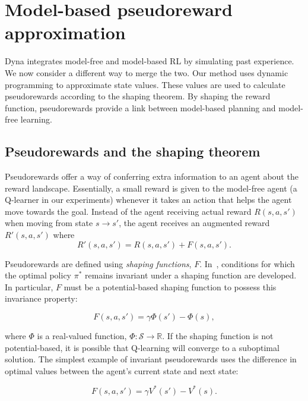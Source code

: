 \documentclass[letterpaper]{article}
\begin{document}
\section{Model-based pseudoreward approximation}

Dyna integrates model-free and model-based RL by simulating past experience. We now consider a different way to merge the two. Our method uses dynamic programming to approximate state values. These values are used to calculate pseudorewards according to the shaping theorem. By shaping the reward function, pseudorewards provide a link between model-based planning and model-free learning.

\subsection{Pseudorewards and the shaping theorem}

Pseudorewards offer a way of conferring extra information to an agent about the reward landscape. Essentially, a small reward is given to the model-free agent (a Q-learner in our experiments) whenever it takes an action that helps the agent move towards the goal. Instead of the agent receiving actual reward $R(s,a,s')$ when moving from state $s \rightarrow s'$, the agent receives an augmented reward $R'(s,a,s')$ where
\begin{equation}
R'(s,a,s') = R(s,a,s') + F(s,a,s').
\end{equation} 

Pseudorewards are defined using \textit{shaping functions}, $F$. In~\cite{ng1999policy}, conditions for which the optimal policy $\pi^*$ remains invariant under a shaping function are developed. In particular, $F$ must be a potential-based shaping function to possess this invariance property:

\begin{equation}
F(s,a,s') = \gamma \Phi(s') - \Phi(s) ,
\end{equation}

\noindent
where $\Phi$ is a real-valued function, $\Phi : \mathcal{S} \rightarrow \mathbb{R}$. If the shaping function is not potential-based, it is possible that Q-learning will converge to a suboptimal solution. The simplest example of invariant pseudorewards uses the difference in optimal values between the agent's current state and next state:

\begin{equation}
F(s,a,s') = \gamma V^{*}(s') - V^{*}(s) .
\end{equation}
\end{document}
